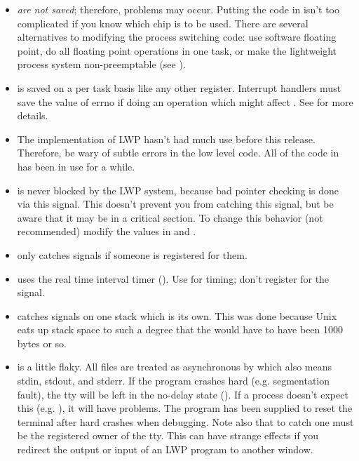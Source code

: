 \begin{itemize}
\item
     {\em are not saved}; therefore, problems
    may occur.  Putting the code in isn't too complicated if you
    know which chip is to be used.  There are several alternatives
    to modifying the process switching code: use software floating
    point, do all floating point operations in one task, or 
    make the lightweight process system non-preemptable 
    (see ).
\item
     is saved on a per task basis like any other
    register.  Interrupt handlers must save the value of errno if
    doing an operation which might affect .   See
     for more details.
\item
    The implementation of LWP hasn't had much use before this
    release.  Therefore, be wary of subtle errors in the low
    level code.  All of the code in 
    has been in use for a while.
\item
     is never blocked by the LWP system, because
    bad pointer checking is done via this signal.  This doesn't
    prevent you from catching this signal, but be aware that it
    may be in a critical section.  To change this behavior (not
    recommended) modify the values in 
    and .  
\item
     only catches signals if someone is
    registered for them.
\item
     uses the real time interval timer
    ().
    Use  for timing; don't register for the
    signal.
\item
     catches signals on one stack which
    is its own.  This was done because Unix eats up stack
    space to such a degree that the  would
    have to have been 1000 bytes or so.
\item    
     is a little flaky.  All files are
    treated as asynchronous by  which
    also means stdin, stdout, and stderr.   If the program
    crashes hard (e.g. segmentation fault), the tty will be
    left in the no-delay state ().  If a
    process doesn't expect this (e.g. ),
    it will have problems.  The program 
    has been supplied to reset the terminal after hard crashes
    when debugging.  Note also that to catch 
    one must be the registered owner of the tty.  This can have
    strange effects if you redirect the output or input of an
    LWP program to another window.


\end{itemize}

